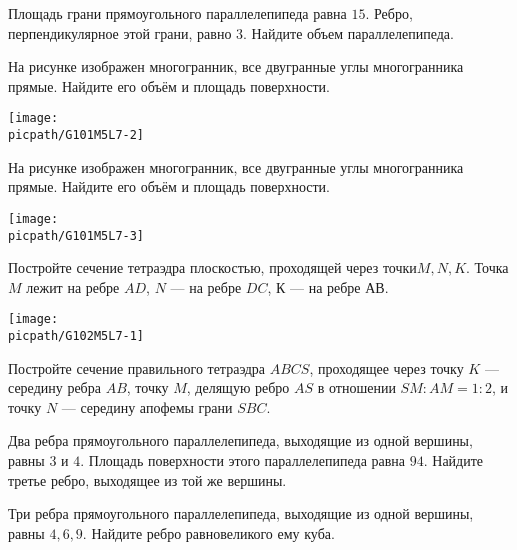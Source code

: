\begin{exam}
	\begin{listofex}
			\item Площадь грани прямоугольного параллелепипеда равна \( 15 \). Ребро, перпендикулярное этой грани, равно \(3\). Найдите объем параллелепипеда.
		\item 
		\begin{minipage}[t]{\bodywidth}
			На рисунке изображен многогранник, все двугранные углы многогранника прямые. Найдите его объём и площадь поверхности.
		\end{minipage}
		\hspace{0.02\linewidth}
		\begin{minipage}[t]{\picwidth}
			\texttt{[image: \\picpath/G101M5L7-2]}
		\end{minipage}
		\item 
		\begin{minipage}[t]{\bodywidth}
			На рисунке изображен многогранник, все двугранные углы многогранника прямые. Найдите его объём и площадь поверхности.
		\end{minipage}
		\hspace{0.02\linewidth}
		\begin{minipage}[t]{\picwidth}
			\texttt{[image: \\picpath/G101M5L7-3]}
		\end{minipage}
		\item
		\begin{minipage}[t]{\bodywidth}
			Постройте сечение тетраэдра плоскостью, проходящей через точки\( M, N, K\). Точка \(M\) лежит на ребре \(AD\), \(N\) --- на ребре \(DC\), \(К\) --- на ребре АВ.
		\end{minipage}
		\begin{minipage}[t]{\picwidth}
			\texttt{[image: \\picpath/G102M5L7-1]}
		\end{minipage}
		\item Постройте сечение правильного тетраэдра \(ABCS\), проходящее через точку \(K\) --- середину ребра \(AB\), точку \(M\), делящую ребро \(AS\) в отношении \(SM:AM = 1:2\), и точку \(N\) --- середину апофемы грани \(SBC\).
		\item Два ребра прямоугольного параллелепипеда, выходящие из одной вершины, равны \(3\) и \(4\). Площадь поверхности этого параллелепипеда равна \(94\). Найдите третье ребро, выходящее из той же вершины.
		\item Три ребра прямоугольного параллелепипеда, выходящие из одной вершины, равны \(4, 6, 9\). Найдите ребро равновеликого ему куба.
	\end{listofex}
\end{exam}

